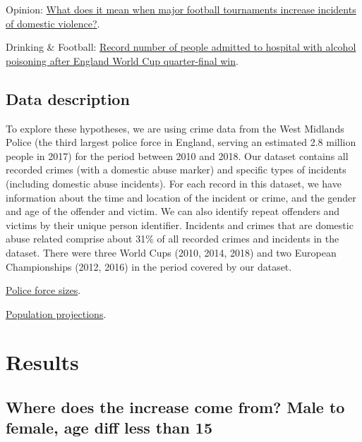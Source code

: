 \documentclass[12pt, letterpaper]{article}
\begin{document}
Opinion: \href{https://www.newstatesman.com/politics/sport/2016/07/what-does-it-mean-when-major-football-tournaments-increase-incidents-domestic}{What does it mean when major football tournaments increase incidents of domestic violence?}.

Drinking \& Football: \href{https://www.independent.co.uk/news/health/world-cup-2018-england-vs-sweden-alcohol-poisoning-hospital-record-number-quarter-semi-final-croatia-a8702961.html}{Record number of people admitted to hospital with alcohol poisoning after England World Cup quarter-final win}.

\subsection{Data description}

To explore these hypotheses, we are using crime data from the West Midlands Police (the third largest police force in England, serving an estimated 2.8 million people in 2017) for the period between 2010 and 2018. Our dataset contains all recorded crimes (with a domestic abuse marker) and specific types of incidents (including domestic abuse incidents). For each record in this dataset, we have information about the time and location of the incident or crime, and the gender and age of the offender and victim. We can also identify repeat offenders and victims by their unique person identifier. Incidents and crimes that are domestic abuse related comprise about 31\% of all recorded crimes and incidents in the dataset. There were three World Cups (2010, 2014, 2018) and two European Championships (2012, 2016) in the period covered by our dataset. 

\href{https://www.gov.uk/government/statistics/police-funding-for-england-and-wales-2015-to-2019}{Police force sizes}.

\href{https://www.nomisweb.co.uk/reports/lmp/la/1967128614/report.aspx#tabrespop}{Population projections}.




\section{Results}

\newpage

\subsection{Where does the increase come from? Male to female, age diff less than 15}
\end{document}
